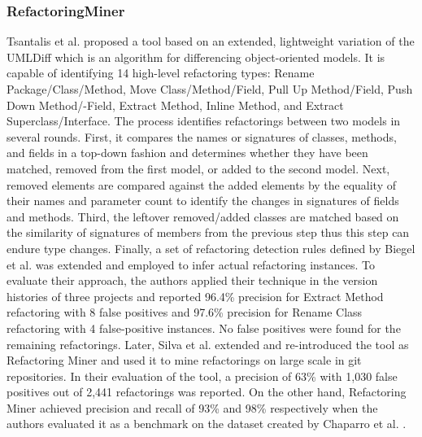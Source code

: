 \documentclass[letterpaper,12pt,onecolumn,final]{report}
\begin{document}
\subsubsection{RefactoringMiner}
Tsantalis et al. \cite{Tsantalis2013} proposed a tool based on an extended, lightweight variation of the UMLDiff \cite{Xing2005} which is an algorithm for differencing object-oriented models. It is capable of identifying 14 high-level refactoring types: Rename Package/Class/Method, Move Class/Method/Field, Pull Up Method/Field, Push Down Method/-Field, Extract Method, Inline Method, and Extract Superclass/Interface. The process identifies refactorings between two models in several rounds. First, it compares the names or signatures of classes, methods, and fields in a top-down fashion and determines whether they have been matched, removed from the first model, or added to the second model. Next, removed elements are compared against the added elements by the equality of their names and parameter count to identify the changes in signatures of fields and methods. Third, the leftover removed/added classes are matched based on the similarity of signatures of members from the previous step thus this step can endure type changes. Finally, a set of refactoring detection rules defined by Biegel et al. \cite{Biegel2001} was extended and employed to infer actual refactoring instances. To evaluate their approach, the authors applied their technique in the version histories of three projects and reported 96.4\% precision for Extract Method refactoring with 8 false positives and 97.6\% precision for Rename Class refactoring with 4 false-positive instances. No false positives were found for the remaining refactorings. Later, Silva et al. \cite{Silva2016} extended and re-introduced the tool as Refactoring Miner and used it to mine refactorings on large scale in git repositories. In their evaluation of the tool, a precision of 63\% with 1,030 false positives out of 2,441 refactorings was reported. On the other hand, Refactoring Miner achieved precision and recall of 93\% and 98\% respectively when the authors evaluated it as a benchmark on the dataset created by Chaparro et al. \cite{Chaparro2014}.
\end{document}
